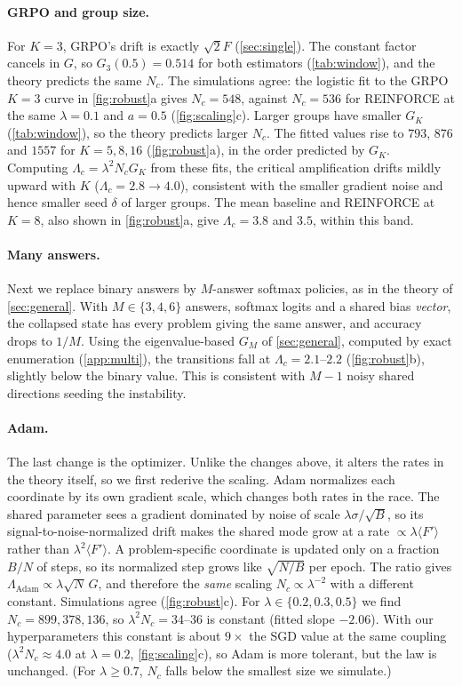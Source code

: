 \paragraph{GRPO and group size.}
For $K=3$, GRPO's drift is exactly $\sqrt2F$ (\cref{sec:single}). The constant factor cancels in $G$, so $G_3(0.5)=0.514$ for both estimators (\cref{tab:window}), and the theory predicts the same $N_c$.
The simulations agree: the logistic fit to the GRPO $K=3$ curve in \cref{fig:robust}a gives $N_c=548$, against $N_c=536$ for REINFORCE at the same $\lambda=0.1$ and $a=0.5$ (\cref{fig:scaling}c).
Larger groups have smaller $G_K$ (\cref{tab:window}), so the theory predicts larger $N_c$. The fitted values rise to $793$, $876$ and $1557$ for $K=5,8,16$ (\cref{fig:robust}a), in the order predicted by $G_K$.
Computing $\Lambda_c=\lambda^2N_cG_K$ from these fits, the critical amplification drifts mildly upward with $K$ ($\Lambda_c=2.8\to4.0$), consistent with the smaller gradient noise and hence smaller seed $\delta$ of larger groups.
The mean baseline and REINFORCE at $K=8$, also shown in \cref{fig:robust}a, give $\Lambda_c=3.8$ and $3.5$, within this band.

\paragraph{Many answers.}
Next we replace binary answers by $M$-answer softmax policies, as in the theory of \cref{sec:general}.
With $M\in\{3,4,6\}$ answers, softmax logits and a shared bias \emph{vector}, the collapsed state has every problem giving the same answer, and accuracy drops to $1/M$.
Using the eigenvalue-based $G_M$ of \cref{sec:general}, computed by exact enumeration (\cref{app:multi}), the transitions fall at $\Lambda_c=2.1$--$2.2$ (\cref{fig:robust}b), slightly below the binary value. This is consistent with $M-1$ noisy shared directions seeding the instability.

\paragraph{Adam.}
The last change is the optimizer. Unlike the changes above, it alters the rates in the theory itself, so we first rederive the scaling.
Adam \citep{kingma2015adam} normalizes each coordinate by its own gradient scale, which changes both rates in the race.
The shared parameter sees a gradient dominated by noise of scale $\lambda\sigma/\sqrt B$, so its signal-to-noise-normalized drift makes the shared mode grow at a rate $\propto\lambda\langle F'\rangle$ rather than $\lambda^2\langle F'\rangle$.
A problem-specific coordinate is updated only on a fraction $B/N$ of steps, so its normalized step grows like $\sqrt{N/B}$ per epoch.
The ratio gives $\Lambda_{\mathrm{Adam}}\propto\lambda\sqrt N\,G$, and therefore the \emph{same} scaling $N_c\propto\lambda^{-2}$ with a different constant.
Simulations agree (\cref{fig:robust}c). For $\lambda\in\{0.2,0.3,0.5\}$ we find $N_c=899,378,136$, so $\lambda^2N_c=34$--$36$ is constant (fitted slope $-2.06$). With our hyperparameters this constant is about $9\times$ the SGD value at the same coupling ($\lambda^2N_c\approx4.0$ at $\lambda=0.2$, \cref{fig:scaling}c), so Adam is more tolerant, but the law is unchanged.
(For $\lambda\ge0.7$, $N_c$ falls below the smallest size we simulate.)
